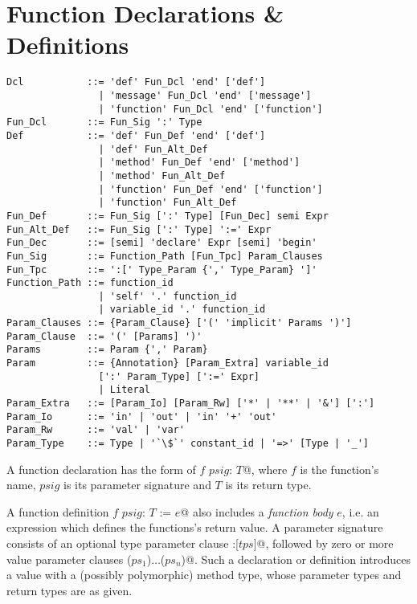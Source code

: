 
\section{Function Declarations \& Definitions}

\syntax\begin{lstlisting}[escapechar=`]
Dcl           ::= 'def' Fun_Dcl 'end' ['def']
                | 'message' Fun_Dcl 'end' ['message']
                | 'function' Fun_Dcl 'end' ['function']
Fun_Dcl       ::= Fun_Sig ':' Type
Def           ::= 'def' Fun_Def 'end' ['def']
                | 'def' Fun_Alt_Def
                | 'method' Fun_Def 'end' ['method']
                | 'method' Fun_Alt_Def
                | 'function' Fun_Def 'end' ['function']
                | 'function' Fun_Alt_Def
Fun_Def       ::= Fun_Sig [':' Type] [Fun_Dec] semi Expr
Fun_Alt_Def   ::= Fun_Sig [':' Type] ':=' Expr
Fun_Dec       ::= [semi] 'declare' Expr [semi] 'begin'
Fun_Sig       ::= Function_Path [Fun_Tpc] Param_Clauses
Fun_Tpc       ::= ':[' Type_Param {',' Type_Param} ']'
Function_Path ::= function_id
                | 'self' '.' function_id
                | variable_id '.' function_id
Param_Clauses ::= {Param_Clause} ['(' 'implicit' Params ')']
Param_Clause  ::= '(' [Params] ')'
Params        ::= Param {',' Param}
Param         ::= {Annotation} [Param_Extra] variable_id 
                [':' Param_Type] [':=' Expr]
                | Literal
Param_Extra   ::= [Param_Io] [Param_Rw] ['*' | '**' | '&'] [':']
Param_Io      ::= 'in' | 'out' | 'in' '+' 'out'
Param_Rw      ::= 'val' | 'var'
Param_Type    ::= Type | '`\$`' constant_id | '=>' [Type | '_']
\end{lstlisting}


A function declaration has the form of \lstinline@def $f$ $psig$: $T$@, where $f$ is the function's name, $psig$ is its parameter signature and $T$ is its return type. 

A function definition \lstinline@def $f$ $psig$: $T$ := $e$@ also includes a {\em function body} $e$, i.e. an expression which defines the functions's return value. A parameter signature consists of an optional type parameter clause \lstinline@:[$tps$]@, followed by zero or more value parameter clauses \lstinline@($ps_1$)$\ldots$($ps_n$)@. Such a declaration or definition introduces a value with a (possibly polymorphic) method type, whose parameter types and return types are as given. 


